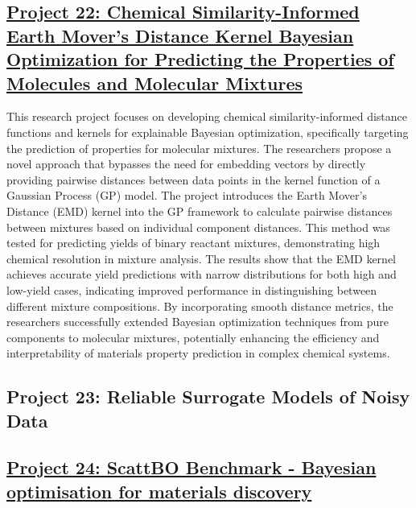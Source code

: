  \subsection*{\href{https://www.youtube.com/watch?v=I179UR8P054}{Project 22: Chemical Similarity-Informed Earth Mover’s Distance Kernel Bayesian Optimization for Predicting the Properties of Molecules and Molecular Mixtures}}

This research project focuses on developing chemical similarity-informed distance functions and kernels for explainable Bayesian optimization, specifically targeting the prediction of properties for molecular mixtures. The researchers propose a novel approach that bypasses the need for embedding vectors by directly providing pairwise distances between data points in the kernel function of a Gaussian Process (GP) model\cite{moss_gaussian_2020}. The project introduces the Earth Mover's Distance (EMD) kernel\cite{hargreaves_earth_2020} into the GP framework to calculate pairwise distances between mixtures based on individual component distances. This method was tested for predicting yields of binary reactant mixtures, demonstrating high chemical resolution in mixture analysis. The results show that the EMD kernel achieves accurate yield predictions with narrow distributions for both high and low-yield cases, indicating improved performance in distinguishing between different mixture compositions. By incorporating smooth distance metrics, the researchers successfully extended Bayesian optimization techniques from pure components to molecular mixtures, potentially enhancing the efficiency and interpretability of materials property prediction in complex chemical systems.
 \subsection*{Project 23: Reliable Surrogate Models of Noisy Data}


 \subsection*{\href{https://twitter.com/SodeAndy/status/1773474538631651769}{Project 24: ScattBO Benchmark - Bayesian optimisation for materials discovery}}

